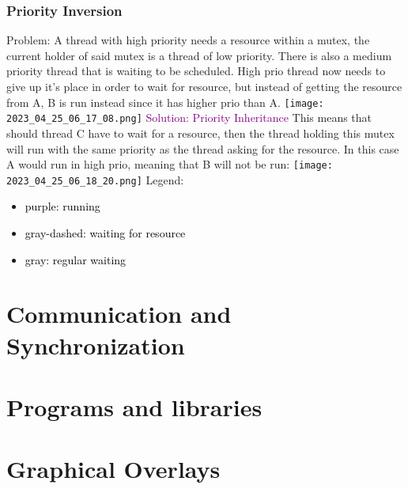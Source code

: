 \documentclass[main.tex,fontsize=8pt,paper=a4,paper=portrait,DIV=calc,]{scrartcl}
\begin{document}
\subsubsection{Priority Inversion}
Problem: A thread with high priority needs a resource within a mutex, the current holder of said mutex is a thread of low priority.\newline
There is also a medium priority thread that is waiting to be scheduled.\newline
High prio thread now needs to give up it's place in order to wait for resource, but instead of getting the resource from A, B is run instead since it has higher prio than A.\newline
\texttt{[image: 2023\_04\_25\_06\_17\_08.png]}\newline
\textcolor{purple}{Solution: Priority Inheritance}\newline
This means that should thread C have to wait for a resource, then the thread holding this mutex will run with the same priority as the thread asking for the resource. \newline
In this case A would run in high prio, meaning that B will not be run:\newline
\texttt{[image: 2023\_04\_25\_06\_18\_20.png]}\newline
Legend:
\begin{itemize}
\item \textcolor{black}{purple: running}
\item \textcolor{black}{gray-dashed: waiting for resource}
\item \textcolor{black}{gray: regular waiting}
\end{itemize} 

\section{Communication and Synchronization}

\section{Programs and libraries}

\section{Graphical Overlays}
\end{document}
